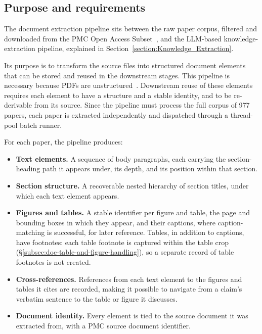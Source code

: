 \subsection{Purpose and requirements}\label{subsec:doc-extraction-purpose}

The document extraction pipeline sits between the raw paper corpus, filtered and downloaded from the PMC Open Access Subset~\parencite{nlm_pmc_open_access}, and the LLM-based knowledge-extraction pipeline, explained in Section~\ref{section:Knowledge_Extraction}.

Its purpose is to transform the source files into structured document elements that can be stored and reused in the downstream stages. This pipeline is necessary because PDFs are unstructured~\parencite{ramakrishnan2012layoutawaretextextraction, tiedemann2014improvedtextextraction, hansen2019datadrivenrecognitionextraction}. Downstream reuse of these elements requires each element to have a structure and a stable identity, and to be re-derivable from its source. Since the pipeline must process the full corpus of 977 papers, each paper is extracted independently and dispatched through a thread-pool batch runner.

\medskip{}

For each paper, the pipeline produces: 

\begin{itemize}[label={}, leftmargin=1.5em, itemsep=0.4em]
    \item \textbf{Text elements.} A sequence of body paragraphs, each carrying the section-heading path it appears under, its depth, and its position within that section.
    
    \item \textbf{Section structure.} A recoverable nested hierarchy of section titles, under which each text element appears.
    
    \item \textbf{Figures and tables.} A stable identifier per figure and table, the page and bounding boxes in which they appear, and their captions, where caption-matching is successful, for later reference. Tables, in addition to captions, have footnotes: each table footnote is captured within the table crop (§\ref{subsec:doc-table-and-figure-handling}), so a separate record of table footnotes is not created.
    
    \item \textbf{Cross-references.} References from each text element to the figures and tables it cites are recorded, making it possible to navigate from a claim's verbatim sentence to the table or figure it discusses. 
    
    \item \textbf{Document identity.} Every element is tied to the source document it was extracted from, with a PMC source document identifier. 
    
\end{itemize}

